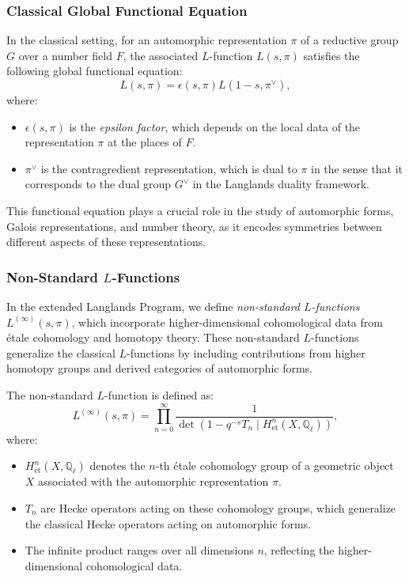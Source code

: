 \documentclass{article}
\theoremstyle{remark}
\begin{document}
\subsubsection{Classical Global Functional Equation}

In the classical setting, for an automorphic representation $\pi$ of a reductive group $G$ over a number field $F$, the associated $L$-function $L(s, \pi)$ satisfies the following global functional equation:
\[
L(s, \pi) = \epsilon(s, \pi) L(1 - s, \pi^\vee),
\]
where:
\begin{itemize}
    \item $\epsilon(s, \pi)$ is the \emph{epsilon factor}, which depends on the local data of the representation $\pi$ at the places of $F$.
    \item $\pi^\vee$ is the contragredient representation, which is dual to $\pi$ in the sense that it corresponds to the dual group $G^\vee$ in the Langlands duality framework.
\end{itemize}
This functional equation plays a crucial role in the study of automorphic forms, Galois representations, and number theory, as it encodes symmetries between different aspects of these representations.

\subsubsection{Non-Standard $L$-Functions}

In the extended Langlands Program, we define \emph{non-standard $L$-functions} $L^{(\infty)}(s, \pi)$, which incorporate higher-dimensional cohomological data from étale cohomology and homotopy theory. These non-standard $L$-functions generalize the classical $L$-functions by including contributions from higher homotopy groups and derived categories of automorphic forms.

The non-standard $L$-function is defined as:
\[
L^{(\infty)}(s, \pi) = \prod_{n=0}^{\infty} \frac{1}{\det(1 - q^{-s} T_n \mid H^n_{\text{et}}(X, \mathbb{Q}_\ell))},
\]
where:
\begin{itemize}
    \item $H^n_{\text{et}}(X, \mathbb{Q}_\ell)$ denotes the $n$-th étale cohomology group of a geometric object $X$ associated with the automorphic representation $\pi$.
    \item $T_n$ are Hecke operators acting on these cohomology groups, which generalize the classical Hecke operators acting on automorphic forms.
    \item The infinite product ranges over all dimensions $n$, reflecting the higher-dimensional cohomological data.
\end{itemize}
\end{document}
